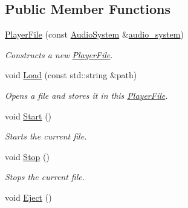 \subsection*{Public Member Functions}
\begin{DoxyCompactItemize}
\item 
\hyperlink{classPlayerFile_a655a5bf6903cad650c0dc4e33a7e41a5}{Player\+File} (const \hyperlink{classAudioSystem}{Audio\+System} \&\hyperlink{classPlayerFile_a8de47bcb924e2c3e10b208a09eb3f05b}{audio\+\_\+system})
\begin{DoxyCompactList}\small\item\em Constructs a new \hyperlink{classPlayerFile}{Player\+File}. \end{DoxyCompactList}\item 
void \hyperlink{classPlayerFile_a92dd004d4ab034bf41f7d5c76847d3c2}{Load} (const std\+::string \&path)
\begin{DoxyCompactList}\small\item\em Opens a file and stores it in this \hyperlink{classPlayerFile}{Player\+File}. \end{DoxyCompactList}\item 
\hypertarget{classPlayerFile_a426f8ad29efd5e16ac7963354087d070}{void \hyperlink{classPlayerFile_a426f8ad29efd5e16ac7963354087d070}{Start} ()}\label{classPlayerFile_a426f8ad29efd5e16ac7963354087d070}

\begin{DoxyCompactList}\small\item\em Starts the current file. \end{DoxyCompactList}\item 
\hypertarget{classPlayerFile_afd4313009b5d51df0df5dc7b59ffcf13}{void \hyperlink{classPlayerFile_afd4313009b5d51df0df5dc7b59ffcf13}{Stop} ()}\label{classPlayerFile_afd4313009b5d51df0df5dc7b59ffcf13}

\begin{DoxyCompactList}\small\item\em Stops the current file. \end{DoxyCompactList}\item 
\hypertarget{classPlayerFile_a394b2e7b4f4d0baee4ff1928a36e9945}{void \hyperlink{classPlayerFile_a394b2e7b4f4d0baee4ff1928a36e9945}{Eject} ()}\label{classPlayerFile_a394b2e7b4f4d0baee4ff1928a36e9945}


\end{DoxyCompactItemize}
